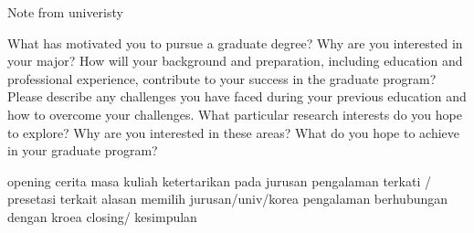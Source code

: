 \documentclass[11pt]{simart} %
\begin{document}
Note from univeristy

 What has motivated you to pursue a graduate degree? Why are you interested in your major?
 How will your background and preparation, including education and professional experience, contribute to your success in the graduate program? Please describe any challenges you have faced during your previous education and how to overcome your challenges.
 What particular research interests do you hope to explore? Why are you interested in these areas? What do you hope to achieve in your graduate program?

opening
cerita masa kuliah
ketertarikan pada jurusan
pengalaman terkati / presetasi terkait
alasan memilih jurusan/univ/korea
pengalaman berhubungan dengan kroea
closing/ kesimpulan














%

%
\end{document}
